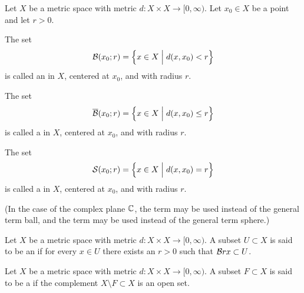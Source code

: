 \begin{definition}
  \label{def:ball}
  Let $X$ be a metric space with metric $d \colon X \times X \to [0,\infty)$.
  Let $x_0 \in X$ be a point and let $r>0$.

  The set
  \begin{align*}
    \BallRC{r}{x_0} = \set{x \in X \; \Big| \; d(x,x_0) < r}
  \end{align*}
  is called an  in $X$, centered at $x_0$, and with radius $r$.

  The set
  \begin{align*}
    \CBallRC{r}{x_0} = \set{x \in X \; \Big| \; d(x,x_0) \le r}
  \end{align*}
  is called a  in $X$, centered at $x_0$, and with radius $r$.

  The set
  \begin{align*}
    \SphereRC{r}{x_0} = \set{x \in X \; \Big| \; d(x,x_0) = r}
  \end{align*}
  is called a  in $X$, centered at $x_0$, and with radius $r$.

  (In the case of the complex plane $\bC$, the term 
  may be used instead of the general term ball, and the term 
  may be used instead of the general term sphere.)
\end{definition}

\begin{definition}
  \label{def:open_set}
  Let $X$ be a metric space with metric $d \colon X \times X \to [0,\infty)$.
  A subset $U \subset X$ is said to be an  if
  for every $x \in U$ there exists an $r > 0$ such that
  $\Ball{r}{x} \subset U$.
\end{definition}

\begin{definition}
  \label{def:closed_set}
  Let $X$ be a metric space with metric $d \colon X \times X \to [0,\infty)$.
  A subset $F \subset X$ is said to be a  if
  the complement $X \setminus F \subset X$ is an open set.
\end{definition}

